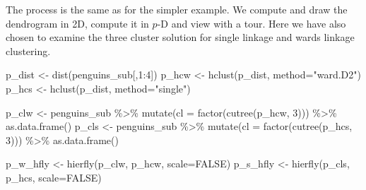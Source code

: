 \documentclass[
  letterpaper,
]{book}
\newenvironment{Shaded}{\begin{snugshade}}{\end{snugshade}}
\newcommand{\AttributeTok}[1]{\textcolor[rgb]{0.40,0.45,0.13}{#1}}
\newcommand{\ConstantTok}[1]{\textcolor[rgb]{0.56,0.35,0.01}{#1}}
\newcommand{\DecValTok}[1]{\textcolor[rgb]{0.68,0.00,0.00}{#1}}
\newcommand{\FunctionTok}[1]{\textcolor[rgb]{0.28,0.35,0.67}{#1}}
\newcommand{\NormalTok}[1]{\textcolor[rgb]{0.00,0.23,0.31}{#1}}
\newcommand{\OtherTok}[1]{\textcolor[rgb]{0.00,0.23,0.31}{#1}}
\newcommand{\SpecialCharTok}[1]{\textcolor[rgb]{0.37,0.37,0.37}{#1}}
\newcommand{\StringTok}[1]{\textcolor[rgb]{0.13,0.47,0.30}{#1}}
\begin{document}
The process is the same as for the simpler example. We compute and draw
the dendrogram in 2D, compute it in \(p\)-D and view with a tour. Here
we have also chosen to examine the three cluster solution for single
linkage and wards linkage clustering.

\begin{Shaded}
\begin{Highlighting}[]
\NormalTok{p\_dist }\OtherTok{\textless{}{-}} \FunctionTok{dist}\NormalTok{(penguins\_sub[,}\DecValTok{1}\SpecialCharTok{:}\DecValTok{4}\NormalTok{])}
\NormalTok{p\_hcw }\OtherTok{\textless{}{-}} \FunctionTok{hclust}\NormalTok{(p\_dist, }\AttributeTok{method=}\StringTok{"ward.D2"}\NormalTok{)}
\NormalTok{p\_hcs }\OtherTok{\textless{}{-}} \FunctionTok{hclust}\NormalTok{(p\_dist, }\AttributeTok{method=}\StringTok{"single"}\NormalTok{)}

\NormalTok{p\_clw }\OtherTok{\textless{}{-}}\NormalTok{ penguins\_sub }\SpecialCharTok{\%\textgreater{}\%} 
  \FunctionTok{mutate}\NormalTok{(}\AttributeTok{cl =} \FunctionTok{factor}\NormalTok{(}\FunctionTok{cutree}\NormalTok{(p\_hcw, }\DecValTok{3}\NormalTok{))) }\SpecialCharTok{\%\textgreater{}\%}
  \FunctionTok{as.data.frame}\NormalTok{()}
\NormalTok{p\_cls }\OtherTok{\textless{}{-}}\NormalTok{ penguins\_sub }\SpecialCharTok{\%\textgreater{}\%} 
  \FunctionTok{mutate}\NormalTok{(}\AttributeTok{cl =} \FunctionTok{factor}\NormalTok{(}\FunctionTok{cutree}\NormalTok{(p\_hcs, }\DecValTok{3}\NormalTok{))) }\SpecialCharTok{\%\textgreater{}\%}
  \FunctionTok{as.data.frame}\NormalTok{()}

\NormalTok{p\_w\_hfly }\OtherTok{\textless{}{-}} \FunctionTok{hierfly}\NormalTok{(p\_clw, p\_hcw, }\AttributeTok{scale=}\ConstantTok{FALSE}\NormalTok{)}
\NormalTok{p\_s\_hfly }\OtherTok{\textless{}{-}} \FunctionTok{hierfly}\NormalTok{(p\_cls, p\_hcs, }\AttributeTok{scale=}\ConstantTok{FALSE}\NormalTok{)}
\end{Highlighting}
\end{Shaded}
\end{document}
